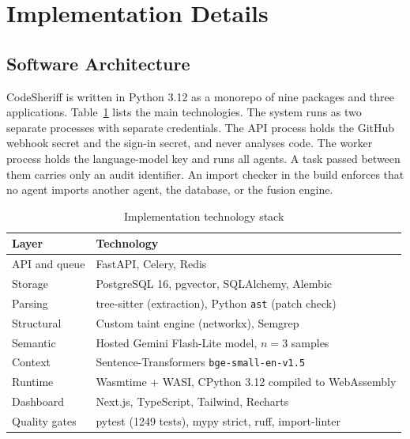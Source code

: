 \documentclass[conference]{IEEEtran}
\begin{document}
\section{Implementation Details} \label{IMP}

\subsection{Software Architecture}
CodeSheriff is written in Python 3.12 as a monorepo of nine packages and
three applications. Table~\ref{tab:stack} lists the main technologies. The
system runs as two separate processes with separate credentials. The API
process holds the GitHub webhook secret and the sign-in secret, and never
analyses code. The worker process holds the language-model key and runs
all agents. A task passed between them carries only an audit identifier.
An import checker in the build enforces that no agent imports another
agent, the database, or the fusion engine.

\begin{table}[t]
\centering
\caption{Implementation technology stack}
\label{tab:stack}
\small
\setlength{\tabcolsep}{3pt}
\begin{tabular}{p{2.2cm}p{5.6cm}}
\toprule
Layer & Technology \\
\midrule
API and queue   & FastAPI, Celery, Redis \\
Storage         & PostgreSQL 16, pgvector, SQLAlchemy, Alembic \\
Parsing         & tree-sitter (extraction), Python \texttt{ast} (patch check) \\
Structural      & Custom taint engine (networkx), Semgrep \\
Semantic        & Hosted Gemini Flash-Lite model, $n=3$ samples \\
Context         & Sentence-Transformers \texttt{bge-small-en-v1.5} \\
Runtime         & Wasmtime + WASI, CPython 3.12 compiled to WebAssembly \\
Dashboard       & Next.js, TypeScript, Tailwind, Recharts \\
Quality gates   & pytest (1249 tests), mypy strict, ruff, import-linter \\
\bottomrule
\end{tabular}
\end{table}
\end{document}
